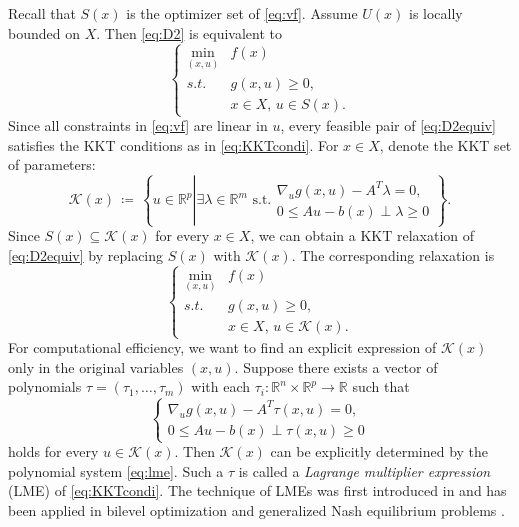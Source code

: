 \documentclass{amsart}
\theoremstyle{plain}
\newcommand{\re}{\mathbb{R}}
\newcommand{\st}{\mathit{s.t.}}
\newcommand{\mc}[1]{\mathcal{#1}}
\numberwithin{equation}{section}
\begin{document}
		Recall that $S(x)$ is the optimizer set of \eqref{eq:vf}.
		Assume $U(x)$ is locally bounded on $X$. Then \eqref{eq:D2} is equivalent to
		\begin{equation}\label{eq:D2equiv}
			\left\{\begin{array}{cl}
				\min\limits_{(x,u)} & f(x)\\
				\st & g(x,u)\ge 0,\\
				& x\in X,\,u\in S(x).
			\end{array}
			\right.
		\end{equation} 
        Since all constraints in \eqref{eq:vf} are linear in $u$,
		every feasible pair of \eqref{eq:D2equiv} satisfies the KKT conditions 
        as in \eqref{eq:KKTcondi}. For $x\in X$, denote the KKT set of parameters:
		\begin{equation}\label{eq:KKTset}
			\mc{K}(x)\,\coloneqq\,\left\{ u\in\re^p \left|
			\exists \lambda\in\re^m\,\,\mbox{s.t.}
			\begin{array}{l}
				\nabla_u g(x,u) - A^T\lambda = 0,\\
				0\le Au-b(x)\perp \lambda\ge 0
			\end{array}
			\right.\right\}.
		\end{equation} 
		Since $S(x)\subseteq \mc{K}(x)$ for every $x\in X$, we can obtain a KKT 
        relaxation of \eqref{eq:D2equiv} by replacing $S(x)$ with $\mc{K}(x)$. 
		The corresponding relaxation is
		\begin{equation}\label{eq:D2rel}
		\left\{\begin{array}{ll}
				\min\limits_{(x,u)} & f(x)\\
				\st & g(x,u)\ge 0,\\
				& x\in X,\, u\in \mc{K}(x).
			\end{array}
			\right.
		\end{equation}
	For computational efficiency, we want to find an explicit expression of $\mc{K}(x)$ 
    only in the original variables $(x,u)$. 
    Suppose there exists a vector of polynomials $\tau = (\tau_1,\ldots, \tau_m)$ 
    with each $\tau_i:\re^n\times \re^p\to \re$ such that 
	\begin{equation}\label{eq:lme}
		\left\{\begin{array}{l}
				\nabla_u g(x,u)-A^T\tau(x,u) =0,\\
				0\le Au-b(x)\perp \tau(x,u)\ge 0
		\end{array}\right.
	\end{equation}
	holds for every $u\in \mc{K}(x)$. Then $\mc{K}(x)$ can be explicitly determined 
	by the polynomial system \eqref{eq:lme}.
	Such a $\tau$ is called a {\it Lagrange multiplier expression} (LME) of \eqref{eq:KKTcondi}.
	The technique of LMEs was first introduced in \cite{nie2019tight} and has been applied in 
	bilevel optimization and generalized Nash equilibrium problems \cite{nietang23cgnep,nie2023rational}.
		
\end{document}
